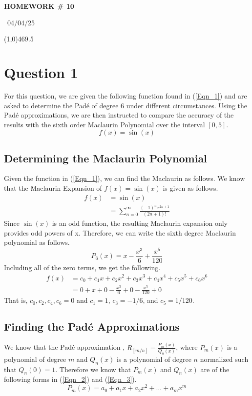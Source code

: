 \documentclass{article}
\begin{document}
\begin{center}
 \LARGE\bfseries HOMEWORK \# 10
\end{center}
\begin{center}
    ~04/04/25~
\end{center}
 \line(1,0){469.5}

\section{Question 1}
For this question, we are given the following function found in (\ref{Eqn_1}) and are asked to determine the Pad\'e of degree 6 under different circumstances. Using the Pad\'e approximations, we are then instructed to compare the accuracy of the results with the sixth order Maclaurin Polynomial over the interval \([0,5]\).
\begin{equation}
    \label{Eqn_1}
    f(x) = \sin{(x)}
\end{equation}

\subsection{Determining the Maclaurin Polynomial}
Given the function in (\ref{Eqn_1}), we can find the Maclaurin as follows. We know that the Maclaurin Expansion of \(f(x)=\sin{(x)}\) is given as follows.
\[
\begin{split}
    f(x) &= \sin{(x)} \\
    &= \sum_{n=0}^\infty \frac{(-1)^nx^{2n+1}}{(2n+1)!}
\end{split}
\]
Since \(\sin{(x)}\) is an odd function, the resulting Maclaurin expansion only provides odd powers of x. Therefore, we can write the sixth degree Maclaurin polynomial as follows.
\[
P_6(x) = x - \frac{x^3}{6} + \frac{x^5}{120}
\]
Including all of the zero terms, we get the following.
\[
\begin{split}
    f(x) &= c_0+c_1x+c_2x^2+c_3x^3+c_4x^4+c_5x^5+c_6x^6 \\
    &= 0 + x + 0 - \frac{x^3}{6} + 0 - \frac{x^5}{120} +0
\end{split}
\]
That is, \(c_0,c_2,c_4,c_6 = 0\) and \(c_1 = 1\), \(c_3 = -1/6\), and \(c_5 = 1/120\).

\subsection{Finding the Pad\'e Approximations}
We know that the Pad\'e approximation , \(R_{[m/n]} = \frac{P_m(x)}{Q_n(x)}\), where \(P_m(x)\) is a polynomial of degree \(m\) and \(Q_n(x)\) is a polynomial of degree \(n\) normalized such that \(Q_n(0) = 1\). Therefore we know that \(P_m(x)\) and \(Q_n(x)\) are of the following forms in (\ref{Eqn_2}) and (\ref{Eqn_3}).
\begin{equation}
    \label{Eqn_2}
    P_m(x) = a_0 + a_1x + a_2x^2 + \dots + a_mx^m
\end{equation}
\end{document}
